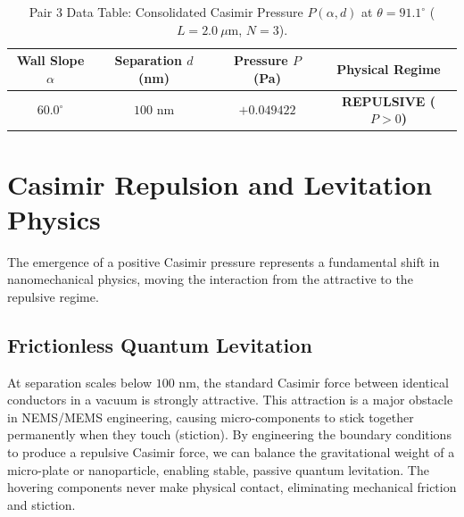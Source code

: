 \documentclass[12pt,letterpaper]{article}
\begin{document}
\begin{table}[h!]
\centering
\caption{Pair 3 Data Table: Consolidated Casimir Pressure $P(\alpha, d)$ at $\theta = 91.1^\circ$ ($L=2.0\ \mu\text{m}$, $N=3$).}
\begin{tabular}{cccc}
\hline
\textbf{Wall Slope $\alpha$} & \textbf{Separation $d$ (nm)} & \textbf{Pressure $P$ (Pa)} & \textbf{Physical Regime} \\
\hline
$60.0^\circ$ & $100$ nm & $+0.049422$ & \textbf{REPULSIVE ($P>0$)} \\
\hline
\end{tabular}
\end{table}


\section{Casimir Repulsion and Levitation Physics}
\label{sec:repulsion_physics}

The emergence of a positive Casimir pressure represents a fundamental shift in nanomechanical physics, moving the interaction from the attractive to the repulsive regime.

\subsection{Frictionless Quantum Levitation}
At separation scales below $100$ nm, the standard Casimir force between identical conductors in a vacuum is strongly attractive. This attraction is a major obstacle in NEMS/MEMS engineering, causing micro-components to stick together permanently when they touch (stiction). By engineering the boundary conditions to produce a repulsive Casimir force, we can balance the gravitational weight of a micro-plate or nanoparticle, enabling stable, passive quantum levitation. The hovering components never make physical contact, eliminating mechanical friction and stiction.
\end{document}
